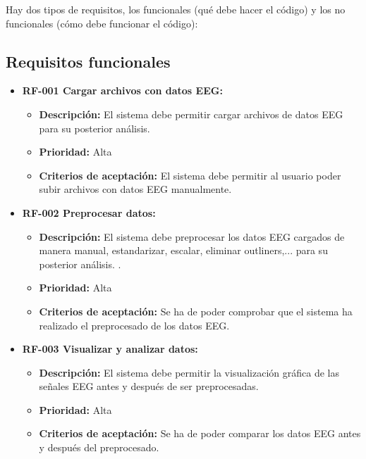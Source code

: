 Hay dos tipos de requisitos, los funcionales (qué debe hacer el código) y los no funcionales (cómo debe funcionar el código): 

\subsection{Requisitos funcionales}

\begin{itemize}
\tightlist
\item
  \textbf{RF-001 Cargar archivos con datos EEG:}
 
  \begin{itemize}
  \tightlist
  \item
   \textbf{Descripción:} El sistema debe permitir cargar archivos de datos EEG para su posterior análisis.
  \item
   \textbf{Prioridad:} Alta
  \item
   \textbf{Criterios de aceptación:} El sistema debe permitir al usuario poder subir archivos con datos EEG manualmente. 
  \end{itemize}


\item
  \textbf{RF-002 Preprocesar datos:}
  
  \begin{itemize}
  \tightlist
  \item
    \textbf{Descripción:} El sistema debe preprocesar los datos EEG cargados de manera manual, estandarizar, escalar, eliminar outliners,... para su posterior análisis.
.
  \item
   \textbf{Prioridad:} Alta
  \item
   \textbf{Criterios de aceptación:} Se ha de poder comprobar que el sistema ha realizado el preprocesado de los datos EEG.
  \end{itemize}
 
  
\item
  \textbf{RF-003 Visualizar y analizar datos:}

  \begin{itemize}
  \tightlist
  \item
    \textbf{Descripción:} El sistema debe permitir la visualización gráfica de las señales EEG antes y después de ser preprocesadas.
  \item
    \textbf{Prioridad:} Alta
  \item
    \textbf{Criterios de aceptación:} Se ha de poder comparar los datos EEG antes y después del preprocesado. 
  \end{itemize}



\end{itemize}
